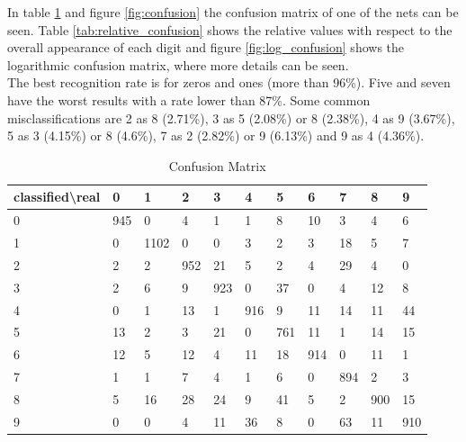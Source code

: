 \documentclass[paper=a4, fontsize=11pt]{scrartcl} %
\numberwithin{equation}{section} %
\numberwithin{figure}{section} %
\numberwithin{table}{section} %
\begin{document}
In table \ref{tab:confusion} and figure \ref{fig:confusion} the confusion matrix of one of the nets can be seen. Table \ref{tab:relative_confusion} shows the relative values with respect to the overall appearance of each digit and figure \ref{fig:log_confusion} shows the logarithmic confusion matrix, where more details can be seen.\\

The best recognition rate is for zeros and ones (more than 96\%). Five and seven have the worst results with a rate lower than 87\%. Some common misclassifications are 2 as 8 (2.71\%), 3 as 5 (2.08\%) or 8 (2.38\%), 4 as 9 (3.67\%), 5 as 3 (4.15\%) or 8 (4.6\%), 7 as 2 (2.82\%) or 9 (6.13\%) and 9 as 4 (4.36\%). 

\begin{table}[H]
\centering
\caption{Confusion Matrix}
\label{tab:confusion}
\begin{tabular}{|l||llllllllll|}
\hline
classified\textbackslash real & 0 & 1 & 2 & 3 & 4 & 5 & 6 & 7 & 8 & 9 \\ \hline\hline
0 & 945 & 0 & 4 & 1 & 1 & 8 & 10 & 3 & 4 & 6 \\ \hline
1 & 0 & 1102 & 0 & 0 & 3 & 2 & 3 & 18 & 5 & 7 \\ \hline
2 & 2 & 2 & 952 & 21 & 5 & 2 & 4 & 29 & 4 & 0 \\ \hline
3 & 2 & 6 & 9 & 923 & 0 & 37 & 0 & 4 & 12 & 8 \\ \hline
4 & 0 & 1 & 13 & 1 & 916 & 9 & 11 & 14 & 11 & 44 \\ \hline
5 & 13 & 2 & 3 & 21 & 0 & 761 & 11 & 1 & 14 & 15 \\ \hline
6 & 12 & 5 & 12 & 4 & 11 & 18 & 914 & 0 & 11 & 1 \\ \hline
7 & 1 & 1 & 7 & 4 & 1 & 6 & 0 & 894 & 2 & 3 \\ \hline
8 & 5 & 16 & 28 & 24 & 9 & 41 & 5 & 2 & 900 & 15 \\ \hline
9 & 0 & 0 & 4 & 11 & 36 & 8 & 0 & 63 & 11 & 910 \\ \hline
\end{tabular}
\end{table}
\end{document}
